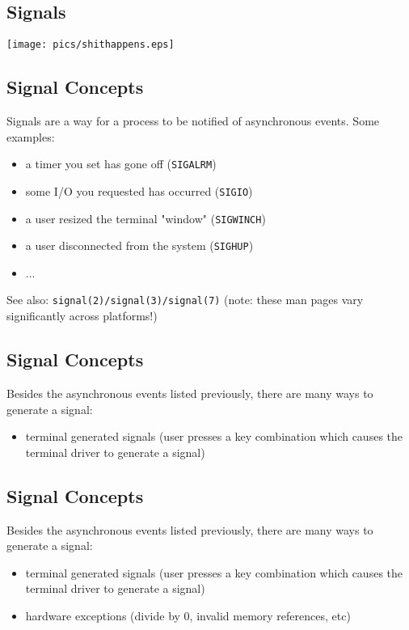 \documentclass[xga]{xdvislides}
\begin{document}
\subsection{Signals}
\begin{center}
	\texttt{[image: pics/shithappens.eps]}
\end{center}

\subsection{Signal Concepts}

Signals are a way for a process to be notified of asynchronous events. Some
examples:

\begin{itemize}
	\item a timer you set has gone off ({\tt SIGALRM})
	\item some I/O you requested has occurred ({\tt SIGIO})
	\item a user resized the terminal "window" ({\tt SIGWINCH})
	\item a user disconnected from the system ({\tt SIGHUP})
	\item ...
\end{itemize}

See also: {\tt signal(2)/signal(3)/signal(7)} (note: these man pages vary
significantly across platforms!)
\subsection{Signal Concepts}
Besides the asynchronous events listed previously, there are many ways to
generate a signal:

\begin{itemize}
	\item terminal generated signals (user presses a key combination which causes
		the terminal driver to generate a signal)
\end{itemize}

\subsection{Signal Concepts}
Besides the asynchronous events listed previously, there are many ways to
generate a signal:

\begin{itemize}
	\item terminal generated signals (user presses a key combination which causes
		the terminal driver to generate a signal)
	\item hardware exceptions (divide by 0, invalid memory references, etc)
\end{itemize}
\end{document}
